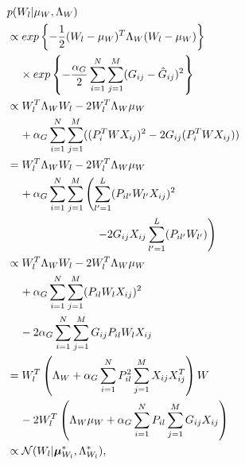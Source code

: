 \documentclass[10pt]{proc}
\begin{document}
\begin{align}
    &p(W_l | \mu_W, \Lambda_W) \\
    \nonumber
    &\propto
        exp\left\{
            -\frac{1}{2} (W_l - \mu_W)^T \Lambda_W (W_l - \mu_W)
        \right\} \\
        &\hspace{4mm}\vspace{-2mm} \times
        exp\left\{
            -\frac{\alpha_G}{2} \sum_{i=1}^N \sum_{j=1}^M
                (G_{ij} - \hat{G}_{ij})^2
        \right\} \\
    \nonumber
    &\propto
        W_l^T \Lambda_W W_l - 2 W_l^T \Lambda_W \mu_W \\
        &\hspace{4mm}\vspace{-2mm}
        + \alpha_G \sum_{i=1}^N \sum_{j=1}^M
        ((P_i^T W X_{ij})^2 - 2 G_{ij} (P_i^T W X_{ij})) \\
    \nonumber
    &=  W_l^T \Lambda_W W_l - 2 W_l^T \Lambda_W \mu_W \\
        &\hspace{4mm}\vspace{-2mm}\nonumber
        + \alpha_G \sum_{i=1}^N \sum_{j=1}^M \left(
            \sum_{l'=1}^L (P_{il'} W_{l'} X_{ij})^2 \right. \\
            &\hspace{28mm}\vspace{-2mm}\left.
            - 2 G_{ij} X_{ij} \sum_{l'=1}^L (P_{il'} W_{l'})
        \right) \\
    \nonumber
    &\propto
        W_l^T \Lambda_W W_l - 2 W_l^T \Lambda_W \mu_W \\
        &\hspace{4mm}\vspace{-2mm}\nonumber
        + \alpha_G \sum_{i=1}^N \sum_{j=1}^M (P_{il} W_l X_{ij})^2 \\
        &\hspace{4mm}\vspace{-2mm}
        - 2 \alpha_G \sum_{i=1}^N \sum_{j=1}^M G_{ij} P_{il} W_l X_{ij} \\
    \nonumber
    &=  W_l^T \left(
            \Lambda_W + \alpha_G \sum_{i=1}^N P_{il}^2
                        \sum_{j=1}^M X_{ij} X_{ij}^T
        \right) W  \\
        &\hspace{4mm}\vspace{-2mm}
        - 2 W_l^T \left(
            \Lambda_W \mu_W + \alpha_G \sum_{i=1}^N P_{il}
                              \sum_{j=1}^M G_{ij} X_{ij}
        \right) \\
    &\propto
        \mathcal{N}(W_l | \bm{\mu}_{W_l}^*, \Lambda_{W_l}^*),
\end{align}
\end{document}
